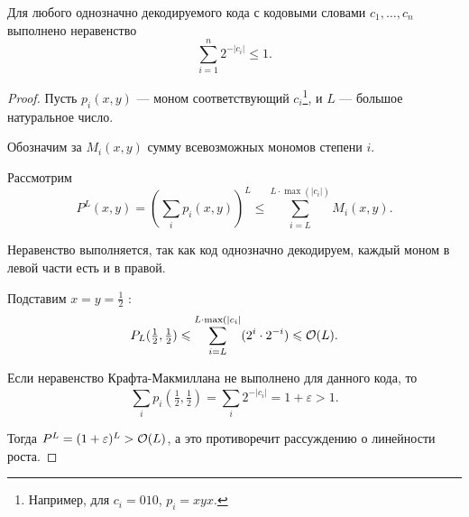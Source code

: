 \begin{thm}
    Для любого однозначно декодируемого кода с кодовыми словами $  c_1, \ldots , c_n$ выполнено неравенство
	\[
	\sum_{i=1}^{n} 2^{-\lvert c_i \rvert } \le 1
	.\] 
\end{thm}
\begin{proof}
	Пусть $ p_i(x, y)$ --- моном соответствующий $ c_i$\footnote{Например, для  $ c_i = 010$,  $ p_i = xyx$.}, и $ L$ --- большое натуральное число.

	Обозначим за $ M_i(x, y)$  сумму всевозможных мономов степени  $ i$.

	Рассмотрим
	\[
		P^{L} (x, y) = \left(\sum_i p_i(x, y)\right)^{L} \le \sum_{i = L}^{L\cdot \max(\lvert c_i \rvert )} M_i(x, y)
	.\] 

	Неравенство выполняется, так как код однозначно декодируем, каждый моном в левой части есть и в правой.

	Подставим $ x = y = \frac{1}{2}$ :
	\[
		P_L(\tfrac{1}{2}, \tfrac{1}{2}) \leqslant \sum_{i= L}^{L \cdot \max(\lvert c_i \rvert } (2^{i} \cdot 2 ^{-i}) \leqslant \mathcal{O}(L)
	.\] 

	Если неравенство Крафта-Макмиллана не выполнено для данного кода, то
	\[
		\sum_{i}^{} p_i (\tfrac{1}{2}, \tfrac{1}{2}) = \sum_i 2^{-\lvert c_i \rvert } = 1 + \varepsilon > 1
	.\] 

	Тогда $ P^{L} = (1 + \varepsilon )^{L} > \mathcal{O}(L)$, а это противоречит рассуждению о линейности роста.
\end{proof}

